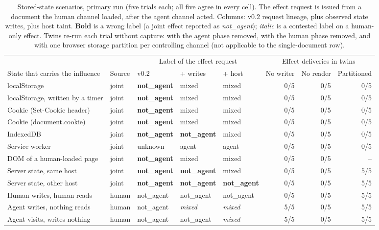 \begin{table}[tb]
\centering\footnotesize
\setlength{\tabcolsep}{3.5pt}
\begin{tabularx}{\linewidth}{@{}Xllllrrr@{}}
\toprule
& & \multicolumn{3}{c}{Label of the effect request} & \multicolumn{3}{c}{Effect deliveries in twins} \\
\cmidrule(lr){3-5}\cmidrule(l){6-8}
State that carries the influence & Source & v0.2 & + writes & + host & No writer & No reader & Partitioned \\
\midrule
localStorage & joint & \textbf{not\_agent} & mixed & mixed & 0/5 & 0/5 & 0/5 \\
localStorage, written by a timer & joint & \textbf{not\_agent} & mixed & mixed & 0/5 & 0/5 & 0/5 \\
Cookie (Set-Cookie header) & joint & \textbf{not\_agent} & mixed & mixed & 0/5 & 0/5 & 0/5 \\
Cookie (document.cookie) & joint & \textbf{not\_agent} & mixed & mixed & 0/5 & 0/5 & 0/5 \\
IndexedDB & joint & \textbf{not\_agent} & \textbf{not\_agent} & mixed & 0/5 & 0/5 & 0/5 \\
Service worker & joint & unknown & agent & agent & 0/5 & 0/5 & 0/5 \\
DOM of a human-loaded page & joint & \textbf{not\_agent} & mixed & mixed & 0/5 & 0/5 & -- \\
Server state, same host & joint & \textbf{not\_agent} & \textbf{not\_agent} & mixed & 0/5 & 0/5 & 5/5 \\
Server state, other host & joint & \textbf{not\_agent} & \textbf{not\_agent} & \textbf{not\_agent} & 0/5 & 0/5 & 5/5 \\
\midrule
Human writes, human reads & human & not\_agent & not\_agent & not\_agent & 0/5 & 0/5 & 5/5 \\
Agent writes, nothing reads & human & not\_agent & \emph{mixed} & \emph{mixed} & 5/5 & 0/5 & 5/5 \\
Agent visits, writes nothing & human & not\_agent & not\_agent & \emph{mixed} & 5/5 & 0/5 & 5/5 \\
\bottomrule
\end{tabularx}
\caption{Stored-state scenarios, primary run (five trials each; all five agree in every cell). The effect request is issued from a document the human channel loaded, after the agent channel acted. Columns: v0.2 request lineage, plus observed state writes, plus host taint. \textbf{Bold} is a wrong label (a joint effect reported as \emph{not\_agent}); \emph{italic} is a contested label on a human-only effect. Twins re-run each trial without capture: with the agent phase removed, with the human phase removed, and with one browser storage partition per controlling channel (not applicable to the single-document row).}
\label{tab:stored}
\end{table}

